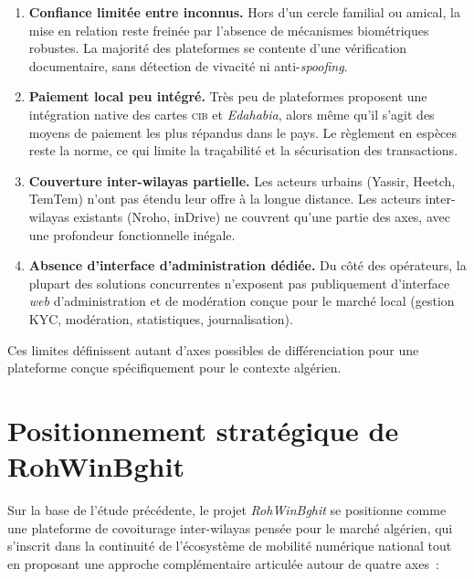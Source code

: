 \documentclass[12pt, a4paper, oneside]{report}
\begin{document}
\begin{enumerate}
  \item \textbf{Confiance limitée entre inconnus.} Hors d'un cercle familial ou amical, la mise en relation reste freinée par l'absence de mécanismes biométriques robustes. La majorité des plateformes se contente d'une vérification documentaire, sans détection de vivacité ni anti-\textit{spoofing}.
  \item \textbf{Paiement local peu intégré.} Très peu de plateformes proposent une intégration native des cartes \textsc{cib} et \textit{Edahabia}, alors même qu'il s'agit des moyens de paiement les plus répandus dans le pays. Le règlement en espèces reste la norme, ce qui limite la traçabilité et la sécurisation des transactions.
  \item \textbf{Couverture inter-wilayas partielle.} Les acteurs urbains (Yassir, Heetch, TemTem) n'ont pas étendu leur offre à la longue distance. Les acteurs inter-wilayas existants (Nroho, inDrive) ne couvrent qu'une partie des axes, avec une profondeur fonctionnelle inégale.
  \item \textbf{Absence d'interface d'administration dédiée.} Du côté des opérateurs, la plupart des solutions concurrentes n'exposent pas publiquement d'interface \textit{web} d'administration et de modération conçue pour le marché local (gestion KYC, modération, statistiques, journalisation).
\end{enumerate}

Ces limites définissent autant d'axes possibles de différenciation pour une plateforme conçue spécifiquement pour le contexte algérien.

\section{Positionnement stratégique de RohWinBghit}
\label{sec:positionnement}

Sur la base de l'étude précédente, le projet \textit{RohWinBghit} se positionne comme une plateforme de covoiturage inter-wilayas pensée pour le marché algérien, qui s'inscrit dans la continuité de l'écosystème de mobilité numérique national tout en proposant une approche complémentaire articulée autour de quatre axes~:
\end{document}
